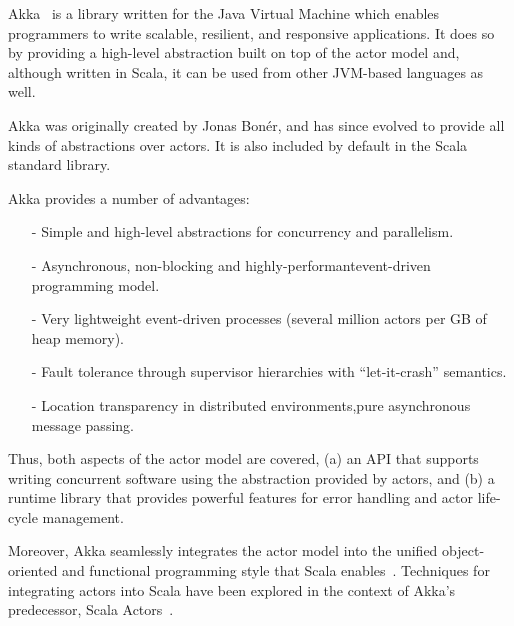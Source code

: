 \documentclass{sig-alternate}
\begin{document}
Akka~\cite{Akka} is a library written for the Java Virtual Machine which enables programmers to write scalable, resilient, and responsive applications. It does so by providing a high-level abstraction built on top of the actor model and, although written in Scala, it can be used from other JVM-based languages as well.

Akka was originally created by Jonas Bon\'{e}r, and has since evolved to provide all kinds of abstractions over actors. It is also included by default in the Scala standard library.

Akka provides a number of advantages:
\begin{itemize}
  \item[-] Simple and high-level abstractions for concurrency and parallelism.
  \item[-] Asynchronous, non-blocking and highly-performant\newline event-driven programming model.
  \item[-] Very lightweight event-driven processes (several million actors per GB of heap memory).
  \item[-] Fault tolerance through supervisor hierarchies with ``let-it-crash'' semantics.
  \item[-] Location transparency in distributed environments,\newline pure asynchronous message passing.
\end{itemize}

Thus, both aspects of the actor model are covered, (a) an API that supports writing concurrent software using the abstraction provided by actors, and (b) a runtime library that provides powerful features for error handling and actor life-cycle management.

Moreover, Akka seamlessly integrates the actor model into the unified object-oriented and functional programming style that Scala enables~\cite{OderskyR14}. Techniques for integrating actors into Scala have been explored in the context of Akka's predecessor, Scala Actors~\cite{HallerO09}.
\end{document}
